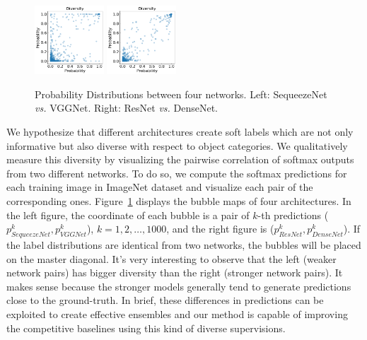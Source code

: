\documentclass[letterpaper]{article} %
\begin{document}
\begin{figure}[t]
	\centering
	\includegraphics[width=0.23\textwidth]{figs/bubble_se_vgg}
	\includegraphics[width=0.23\textwidth]{figs/bubble_resnet_densenet}
	\vspace{-0.1in}
	\caption{Probability Distributions between four networks. Left: SequeezeNet {\em{vs.}} VGGNet. Right: ResNet {\em{vs.}} DenseNet.}
	\label{bubble}
	\vspace{-0.1in}
\end{figure}

We hypothesize that different architectures create soft labels which are not only informative but also diverse with respect to object categories. We qualitatively measure this diversity by visualizing  the pairwise correlation of softmax outputs from two different networks. To do so, we compute the  softmax predictions for each training image in ImageNet dataset and visualize each pair of the corresponding ones. Figure~\ref{bubble} displays the bubble maps of four architectures. In the left figure, the coordinate of each bubble is a pair of $k$-th predictions ($p^k_{SequeezeNet},p^k_{VGGNet}$), $k=1,2,\dots,1000$, and the right figure is ($p^k_{ResNet},p^k_{DenseNet}$). If the label distributions are identical from two networks, the bubbles will be placed on the master diagonal. %
It's very interesting to observe that the left (weaker network pairs) has bigger diversity than the right (stronger network pairs). It makes sense because the stronger models generally tend to generate predictions close to the ground-truth. In brief, these differences in predictions can be exploited to create effective ensembles and our method is capable of improving the competitive baselines using this kind of diverse supervisions.
\end{document}
